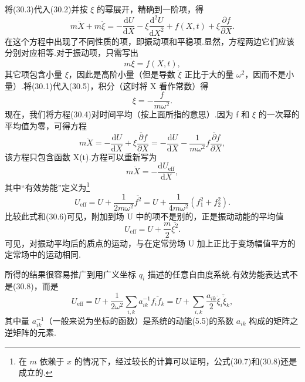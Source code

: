 将(30.3)代入(30.2)并按 $\xi$ 的幂展开，精确到一阶项，得
\begin{equation}
  m\ddot{X}+m\ddot{\xi}
  =-\frac{\mathrm{d}U}{\mathrm{d}X}-\xi\frac{\mathrm{d}^2U}{\mathrm{d}X^2}
  +f(X,t)+\xi\frac{\partial f}{\partial X}.
\end{equation}
在这个方程中出现了不同性质的项，即振动项和平稳项.显然，方程两边它们应该分别对应相等.对于振动项，只需写出
\begin{equation}
  m\ddot{\xi}=f(X,t),
\end{equation}
其它项包含小量 $\xi$，因此是高阶小量（但是导数 $\ddot{\xi}$ 正比于大的量 $\omega^2$，因而不是小量）.将(30.1)代入(30.5)，积分（这时将 X 看作常数）得
\begin{equation}
  \xi=-\frac{f}{m\omega^2}.
\end{equation}
现在，我们将方程(30.4)对时间平均（按上面所指的意思）.因为 f 和 $\xi$ 的一次幂的平均值为零，可得方程
\begin{equation*}
  m\ddot{X}=-\frac{\mathrm{d}U}{\mathrm{d}X}
  +\overline{\xi\frac{\partial f}{\partial X}}
  =-\frac{\mathrm{d}U}{\mathrm{d}X}
  -\frac{1}{m\omega^2}\overline{f\frac{\partial f}{\partial X}},
\end{equation*}
该方程只包含函数 X(t).方程可以重新写为
\begin{equation}
  m\ddot{X}=-\frac{\mathrm{d}U_{\mathrm{eff}}}{\mathrm{d}X},
\end{equation}
其中“有效势能”定义为\footnote{在 $m$ 依赖于 $x$ 的情况下，经过较长的计算可以证明，公式(30.7)和(30.8)还是成立的.}
\begin{equation}
  U_{\mathrm{eff}}=U+\frac{1}{2m\omega^2}\overline{f^2}
  =U+\frac{1}{4m\omega^2}\left(f_1^2+f_2^2\right).
\end{equation}
比较此式和(30.6)可见，附加到场 U 中的项不是别的，正是振动动能的平均值
\begin{equation}
  U_{\mathrm{eff}}=U+\frac{m}{2}\overline{\xi^2}.
\end{equation}
可见，对振动平均后的质点的运动，与在定常势场 U 加上正比于变场幅值平方的定常场中的运动相同.

所得的结果很容易推广到用广义坐标 $q_i$ 描述的任意自由度系统.有效势能表达式不是(30.8)，而是
\begin{equation}
  U_{\mathrm{eff}}=U+\frac{1}{2\omega^2}\sum_{i,k}a_{ik}^{-1}\overline{f_if_k}
  =U+\sum_{i,k}\frac{a_{ik}}{2}\overline{\dot{\xi}_i\dot{\xi}_k},
\end{equation}
其中量 $a_{ik}^{-1}$（一般来说为坐标的函数）是系统的动能(5.5)的系数 $a_{ik}$ 构成的矩阵之逆矩阵的元素.

